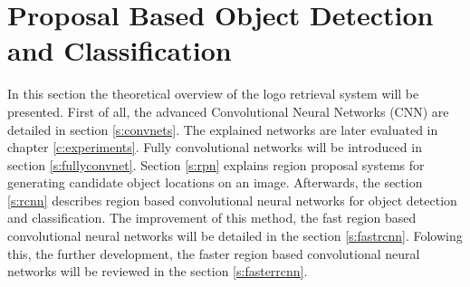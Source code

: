 \chapter{Proposal Based Object Detection and Classification}

In this section the theoretical overview of the logo retrieval system will be presented. First of all, the advanced Convolutional Neural Networks (CNN) are detailed in section \ref{s:convnets}. The explained networks are later evaluated in chapter \ref{c:experiments}. Fully convolutional networks will be introduced in section \ref{s:fullyconvnet}. Section \ref{s:rpn} explains region proposal systems for generating candidate object locations on an image. Afterwards, the section \ref{s:rcnn} describes region based convolutional neural networks for object detection and classification. The improvement of this method, the fast region based convolutional neural networks will be detailed in the section \ref{s:fastrcnn}. Folowing this, the further development, the faster region based convolutional neural networks will be reviewed in the section \ref{s:fasterrcnn}.
\bigbreak
